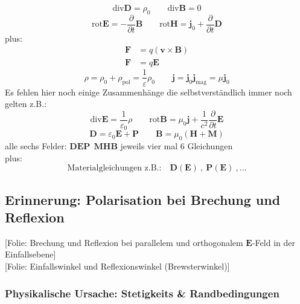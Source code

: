 \documentclass[titlepage,11pt,a4paper,ngerman]{report}
\newcommand{\tx}[1]{\textrm{#1}}
\newcommand{\prt}[2]{\frac{\partial #1}{\partial #2}}
\newcommand{\folie}[1]{\color{gray}[Folie: #1]\color{black}}
\renewcommand{\vec}[1]{\boldsymbol{#1}}
\renewcommand{\epsilon}{\varepsilon}
\begin{document}
\begin{equation*}
\tx{div} \vec{D} = \rho_0 \qquad \tx{div} \vec{B} = 0
\end{equation*}
\begin{equation*}
\tx{rot} \vec{E} = - \prt{}{t} \vec{B} \qquad \tx{rot} \vec{H} = \vec{j}_0 + \prt{}{t} \vec{D}
\end{equation*}
plus:
\begin{align*}
\vec{F} &= q \left(\vec{v} \times \vec{B}\right) \\
\vec{F} &= q \vec{E}
\end{align*}
\begin{equation*}
\rho = \rho_0 + \rho_{\tx{pol}} = \frac{1}{\epsilon} \rho_0 \qquad \vec{j} = \vec{j}_0 \vec{j}_{\tx{mag}} = \mu \vec{j}_0
\end{equation*}
Es fehlen hier noch einige Zusammenhänge die selbstverständlich immer noch gelten z.B.:
\begin{equation*}
\tx{div} \vec{E} = \frac{1}{\epsilon_0} \rho \qquad \tx{rot} \vec{B} = \mu_0 \vec{j} + \frac{1}{c^2} \prt{}{t} \vec{E} 
\end{equation*}
\begin{equation*}
\vec{D} = \epsilon_0 \vec{E} + \vec{P} \qquad \vec{B} = \mu_0\left(\vec{H} + \vec{M}\right)
\end{equation*}
alle sechs Felder: $\vec D  \vec E \vec P \ \ \vec M \vec H \vec B$ jeweils vier mal 6 Gleichungen\\
plus:
\begin{equation*}
\tx{Materialgleichungen z.B.:} \quad \vec{D} (\vec{E}) \ , \ \vec{P}(\vec{E}) \ , \dots
\end{equation*}

\subsection{Erinnerung: Polarisation bei Brechung und Reflexion}

\folie{Brechung und Reflexion bei parallelem und orthogonalem $ \vec{E} $-Feld in der Einfallsebene}\\
\folie{Einfallswinkel und Reflexionswinkel (Brewsterwinkel)}

\subsubsection{Physikalische Ursache: Stetigkeits \& Randbedingungen}
\end{document}
